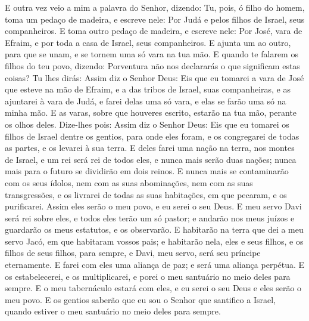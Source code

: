 E outra vez veio a mim a palavra do Senhor, dizendo: Tu,
pois, ó filho do homem, toma um pedaço de madeira, e escreve nele:
Por Judá e pelos filhos de Israel, seus companheiros. E toma outro
pedaço de madeira, e escreve nele: Por José, vara de Efraim, e por
toda a casa de Israel, seus companheiros. E ajunta um ao
outro, para que se unam, e se tornem uma só vara na tua mão.
E quando te falarem os filhos do teu povo, dizendo:
Porventura não nos declararás o que significam estas coisas?
Tu lhes dirás: Assim diz o Senhor Deus: Eis que eu tomarei a
vara de José que esteve na mão de Efraim, e a das tribos de Israel,
suas companheiras, e as ajuntarei à vara de Judá, e farei delas uma
só vara, e elas se farão uma só na minha mão. E as varas,
sobre que houveres escrito, estarão na tua mão, perante os olhos
deles. Dize-lhes pois: Assim diz o Senhor Deus: Eis que eu
tomarei os filhos de Israel dentre os gentios, para onde eles foram,
e os congregarei de todas as partes, e os levarei à sua terra.
E deles farei uma nação na terra, nos montes de Israel, e um
rei será rei de todos eles, e nunca mais serão duas nações; nunca
mais para o futuro se dividirão em dois reinos. E nunca mais
se contaminarão com os seus ídolos, nem com as suas abominações, nem
com as suas transgressões, e os livrarei de todas as suas
habitações, em que pecaram, e os purificarei. Assim eles serão o meu
povo, e eu serei o seu Deus. E meu servo Davi será rei sobre
eles, e todos eles terão um só pastor; e andarão nos meus juízos e
guardarão os meus estatutos, e os observarão. E habitarão na
terra que dei a meu servo Jacó, em que habitaram vossos pais; e
habitarão nela, eles e seus filhos, e os filhos de seus filhos, para
sempre, e Davi, meu servo, será seu príncipe eternamente. E
farei com eles uma aliança de paz; e será uma aliança perpétua. E os
estabelecerei, e os multiplicarei, e porei o meu santuário no meio
deles para sempre. E o meu tabernáculo estará com eles, e eu
serei o seu Deus e eles serão o meu povo. E os gentios
saberão que eu sou o Senhor que santifico a Israel, quando estiver o
meu santuário no meio deles para sempre.

\medskip

